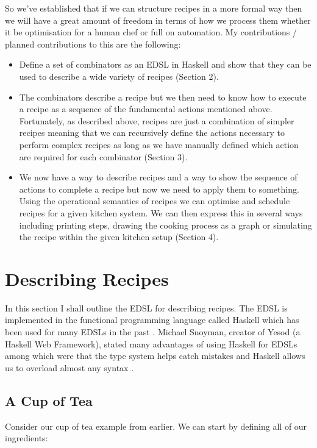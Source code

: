 \documentclass[11pt]{article}
\begin{document}
    So we've established that if we can structure recipes in a more
    formal way then we will have a great amount of freedom in terms
    of how we process them whether it be optimisation for a human
    chef or full on automation. My contributions / planned contributions
    to this are the following:

    \begin{itemize}
        \item Define a set of combinators as an EDSL in Haskell and show that
        they can be used to describe a wide variety of recipes (Section 2).

        \item The combinators describe a recipe but we then need to know
        how to execute a recipe as a sequence of the fundamental actions
        mentioned above. Fortunately, as described above, recipes are just
        a combination of simpler recipes meaning that we can recursively
        define the actions necessary to perform complex recipes as long
        as we have manually defined which action are required for each
        combinator (Section 3).

        \item We now have a way to describe recipes and a way to show the
        sequence of actions to complete a recipe but now we need to apply
        them to something. Using the operational semantics of recipes
        we can optimise and schedule recipes for a given kitchen system.
        We can then express this in several ways including printing steps,
        drawing the cooking process as a graph or simulating the recipe
        within the given kitchen setup (Section 4).
    \end{itemize}

    \section{Describing Recipes}
    In this section I shall outline the EDSL for describing recipes.
    The EDSL is implemented in the functional programming language
    called Haskell which has been used for many EDSLs in the past \cite{hudak}.
    Michael Snoyman, creator of Yesod (a Haskell Web Framework), stated
    many advantages of using Haskell for EDSLs among which were that
    the type system helps catch mistakes and Haskell allows us to
    overload almost any syntax \cite{snoyman}.

    \subsection{A Cup of Tea}
    Consider our cup of tea example from earlier. We can start by
    defining all of our ingredients:
\end{document}
